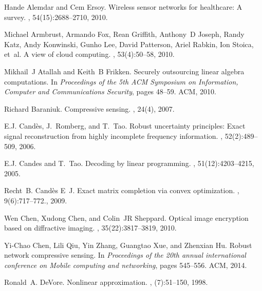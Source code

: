 \documentclass[conference]{IEEEtran}
\begin{document}
\begin{thebibliography}{10}

Hande Alemdar and Cem Ersoy.
\newblock Wireless sensor networks for healthcare: A survey.
, 54(15):2688--2710, 2010.

Michael Armbrust, Armando Fox, Rean Griffith, Anthony~D Joseph, Randy Katz,
  Andy Konwinski, Gunho Lee, David Patterson, Ariel Rabkin, Ion Stoica, et~al.
\newblock A view of cloud computing.
, 53(4):50--58, 2010.

Mikhail~J Atallah and Keith~B Frikken.
\newblock Securely outsourcing linear algebra computations.
\newblock In {\em Proceedings of the 5th ACM Symposium on Information, Computer
  and Communications Security}, pages 48--59. ACM, 2010.

Richard Baraniuk.
\newblock Compressive sensing.
, 24(4), 2007.

E.J. Cand{\`e}s, J.~Romberg, and T.~Tao.
\newblock Robust uncertainty principles: Exact signal reconstruction from
  highly incomplete frequency information.
, 52(2):489--509, 2006.

E.J. Candes and T.~Tao.
\newblock Decoding by linear programming.
, 51(12):4203--4215,
  2005.

Recht~B. Cand{\`e}s E~J.
\newblock Exact matrix completion via convex optimization.
, 9(6):717--772., 2009.

Wen Chen, Xudong Chen, and Colin~JR Sheppard.
\newblock Optical image encryption based on diffractive imaging.
, 35(22):3817--3819, 2010.

Yi-Chao Chen, Lili Qiu, Yin Zhang, Guangtao Xue, and Zhenxian Hu.
\newblock Robust network compressive sensing.
\newblock In {\em Proceedings of the 20th annual international conference on
  Mobile computing and networking}, pages 545--556. ACM, 2014.

Ronald~A. DeVore.
\newblock Nonlinear approximation.
, (7):51--150, 1998.


\end{thebibliography}
\end{document}

